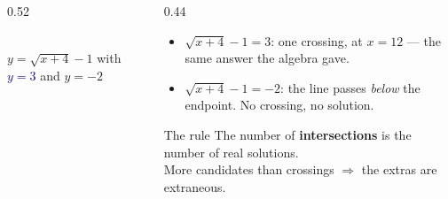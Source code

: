 \documentclass[aspectratio=169, 11pt]{beamer}
\newcommand{\lgrid}[4]{%
  \draw[step=1, linegray!45, thin] (#1,#3) grid (#2,#4);
  \draw[->, thick, charcoal] (#1,0)--(#2,0) node[below right, font=\tiny]{$x$};
  \draw[->, thick, charcoal] (0,#3)--(0,#4) node[left, font=\tiny]{$y$};}
\begin{document}
\begin{frame}[t, plain]
  \begin{columns}[T]
    \begin{column}{0.52\textwidth}
      \centering
      \\[2pt]
      {\scriptsize \textcolor{forest}{$y=\sqrt{x+4}-1$} \; with \; \textcolor{navy}{$y=3$} \; and \;
      \textcolor{goldacc}{$y=-2$}}
    \end{column}
    \begin{column}{0.44\textwidth}
      \footnotesize
      \begin{itemize}\setlength{\itemsep}{4pt}
        \item $\sqrt{x+4}-1=3$: one crossing, at $x=12$ --- the same answer the algebra gave.
        \item $\sqrt{x+4}-1=-2$: the line passes \emph{below} the endpoint. No crossing, no
              solution.
      \end{itemize}
      \vspace{3pt}
      \begin{block}{The rule}
        The number of \textbf{intersections} is the number of real solutions. \\[3pt]
        More candidates than crossings $\Rightarrow$ the extras are extraneous.
      \end{block}
    \end{column}
  \end{columns}
\end{frame}
\end{document}
